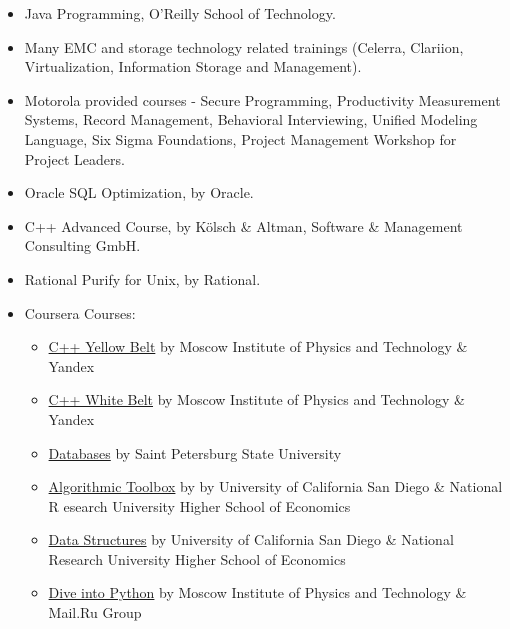 \documentclass[a4paper,12pt,]{article}
\begin{document}
  \begin{itemize}
  
  \item Java Programming, O'Reilly School of Technology.
 
  \item Many EMC and storage technology related trainings (Celerra, Clariion, Virtualization, Information Storage and Management).

  \item Motorola provided courses - Secure Programming, Productivity Measurement Systems,
        Record Management, Behavioral Interviewing, Unified Modeling Language, 
        Six Sigma Foundations, Project Management Workshop for Project Leaders.
 
  \item Oracle SQL Optimization, by Oracle.
    
  \item C++ Advanced Course, by K\"{o}lsch \& Altman, Software \& Management Consulting GmbH.
   
  \item Rational Purify for Unix, by Rational.

  \item Coursera Courses:
    \begin{itemize}

    \item \href{https://www.coursera.org/account/accomplishments/records/9P45944W34BH}{C++ Yellow Belt} by Moscow Institute of Physics and Technology \& Yandex
    \item \href{https://www.coursera.org/account/accomplishments/records/K6MMAY2GPD8C}{C++ White Belt} by Moscow Institute of Physics and Technology \& Yandex
    \item \href{https://www.coursera.org/account/accomplishments/records/23JD5X74V3XF}{Databases} by Saint Petersburg State University

    \item \href{https://www.coursera.org/account/accomplishments/records/ZZ93SJZS28AZ}{Algorithmic Toolbox} by by University of California San Diego \& National R    esearch University Higher School of Economics

    \item \href{https://www.coursera.org/account/accomplishments/records/H5CBQ525DB46}{Data Structures} by University of California San Diego \& National Research University Higher School of Economics

    \item \href{https://www.coursera.org/account/accomplishments/records/N58U22AGLSKR}{Dive into Python} by Moscow Institute of Physics and Technology \& Mail.Ru Group


\end{itemize}
\end{itemize}
\end{document}
